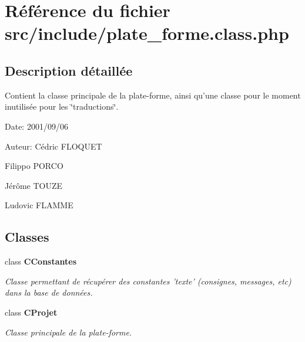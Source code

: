\section{Référence du fichier src/include/plate\_\-forme.class.php}
\label{plate__forme_8class_8php}


\subsection{Description détaillée}
Contient la classe principale de la plate-forme, ainsi qu'une classe pour le moment inutilisée pour les \char`\"{}traductions\char`\"{}. 

\begin{Desc}
\item[Date:]2001/09/06\end{Desc}
\begin{Desc}
\item[Auteur:]Cédric FLOQUET 

Filippo PORCO 

Jérôme TOUZE 

Ludovic FLAMME \end{Desc}


\subsection*{Classes}
\begin{CompactItemize}
\item 
class {\bf CConstantes}
\begin{CompactList}\small\item\em Classe permettant de récupérer des constantes 'texte' (consignes, messages, etc) dans la base de données. \item\end{CompactList}\item 
class {\bf CProjet}
\begin{CompactList}\small\item\em Classe principale de la plate-forme. \item\end{CompactList}\end{CompactItemize}
